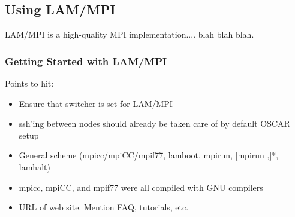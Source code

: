 %
%
%

\subsection{Using LAM/MPI}
\label{app:lam-mpi-overview}

LAM/MPI is a high-quality MPI implementation.... blah blah blah.

\subsubsection{Getting Started with LAM/MPI}

Points to hit:

\begin{itemize}
\item Ensure that switcher is set for LAM/MPI
\item ssh'ing between nodes should already be taken care of by default
  OSCAR setup
\item General scheme (mpicc/mpiCC/mpif77, lamboot, mpirun, [mpirun
  ,]*, lamhalt)
\item mpicc, mpiCC, and mpif77 were all compiled with GNU compilers
\item URL of web site.  Mention FAQ, tutorials, etc.
\end{itemize}
